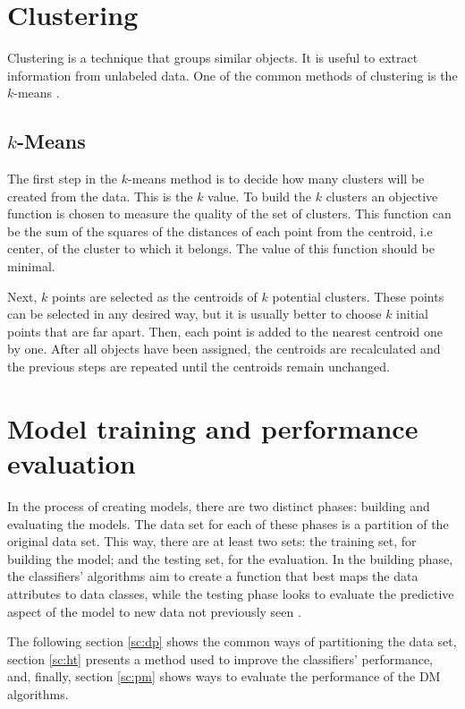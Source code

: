\section{Clustering}

Clustering is a technique that groups similar objects. It is useful to extract information from unlabeled data. One of the common methods of clustering is the $k$-means \cite{bramer2007principles}.

\subsection{$k$-Means}

The first step in the $k$-means method is to decide how many clusters will be created from the data. This is the $k$ value. To build the $k$ clusters an objective function is chosen to measure the quality of the set of clusters. This function can be the sum of the squares of the distances of each point from the centroid, i.e center, of the cluster to which it belongs. The value of this function should be minimal.

Next, $k$ points are selected as the centroids of $k$ potential clusters. These points can be selected in any desired way, but it is usually better to choose $k$ initial points that are far apart. Then, each point is added to the nearest centroid one by one. After all objects have been assigned, the centroids are recalculated and the previous steps are repeated until the centroids remain unchanged.

\section{Model training and performance evaluation}
\label{sc:training}

In the process of creating models, there are two distinct phases: building and evaluating the models. The data set for each of these phases is a partition of the original data set. This way, there are at least two sets: the training set, for building the model; and the testing set, for the evaluation. In the building phase, the classifiers' algorithms aim to create a function that best maps the data attributes to data classes, while the testing phase looks to evaluate the predictive aspect of the model to new data not previously seen \cite{cechinel2020mineraccao}.

The following section \ref{sc:dp} shows the common ways of partitioning the data set, section \ref{sc:ht} presents a method used to improve the classifiers' performance, and, finally, section \ref{sc:pm} shows ways to evaluate the performance of the DM algorithms.

